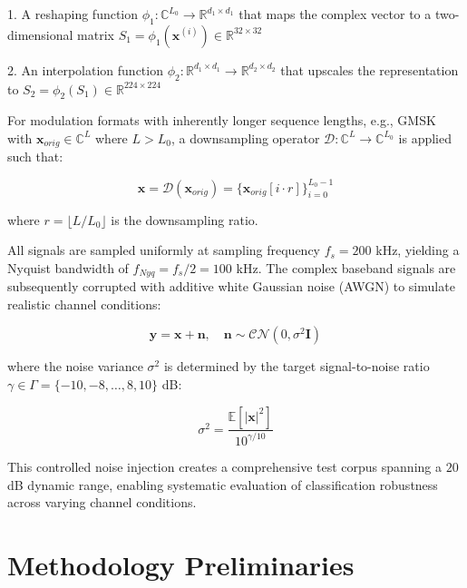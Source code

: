 1. A reshaping function $\phi_1: \mathbb{C}^{L_0} \rightarrow \mathbb{R}^{d_1 \times d_1}$ that maps the complex vector to a two-dimensional matrix $S_1 = \phi_1(\mathbf{x}^{(i)}) \in \mathbb{R}^{32 \times 32}$

2. An interpolation function $\phi_2: \mathbb{R}^{d_1 \times d_1} \rightarrow \mathbb{R}^{d_2 \times d_2}$ that upscales the representation to $S_2 = \phi_2(S_1) \in \mathbb{R}^{224 \times 224}$

For modulation formats with inherently longer sequence lengths, e.g., GMSK with $\mathbf{x}_{orig} \in \mathbb{C}^L$ where $L > L_0$, a downsampling operator $\mathcal{D}: \mathbb{C}^L \rightarrow \mathbb{C}^{L_0}$ is applied such that:

\begin{equation}
\mathbf{x} = \mathcal{D}(\mathbf{x}_{orig}) = \{\mathbf{x}_{orig}[i \cdot r]\}_{i=0}^{L_0-1}
\end{equation}

where $r = \lfloor L/L_0 \rfloor$ is the downsampling ratio.

All signals are sampled uniformly at sampling frequency $f_s = 200$ kHz, yielding a Nyquist bandwidth of $f_{Nyq} = f_s/2 = 100$ kHz. The complex baseband signals are subsequently corrupted with additive white Gaussian noise (AWGN) to simulate realistic channel conditions:

\begin{equation}
\mathbf{y} = \mathbf{x} + \mathbf{n}, \quad \mathbf{n} \sim \mathcal{CN}(0, \sigma^2\mathbf{I})
\end{equation}

where the noise variance $\sigma^2$ is determined by the target signal-to-noise ratio $\gamma \in \Gamma = \{-10, -8, \ldots, 8, 10\}$ dB:

\begin{equation}
\sigma^2 = \frac{\mathbb{E}[|\mathbf{x}|^2]}{10^{\gamma/10}}
\end{equation}

This controlled noise injection creates a comprehensive test corpus spanning a $20$ dB dynamic range, enabling systematic evaluation of classification robustness across varying channel conditions.


\section{Methodology Preliminaries}

